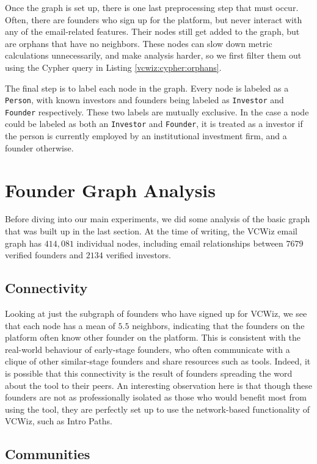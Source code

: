 Once the graph is set up, there is one last preprocessing step that must occur. Often, there are founders who sign up for the platform, but never interact with any of the email-related features. Their nodes still get added to the graph, but are orphans that have no neighbors. These nodes can slow down metric calculations unnecessarily, and make analysis harder, so we first filter them out using the Cypher query in Listing \ref{vcwiz:cypher:orphans}.

The final step is to label each node in the graph. Every node is labeled as a \texttt{Person}, with known investors and founders being labeled as \texttt{Investor} and \texttt{Founder} respectively. These two labels are mutually exclusive. In the case a node could be labeled as both an \texttt{Investor} and \texttt{Founder}, it is treated as a investor if the person is currently employed by an institutional investment firm, and a founder otherwise.

\section{Founder Graph Analysis}

Before diving into our main experiments, we did some analysis of the basic graph that was built up in the last section. At the time of writing, the VCWiz email graph has $414,081$ individual nodes, including email relationships between $7679$ verified founders and $2134$ verified investors.

\subsection{Connectivity}

Looking at just the subgraph of founders who have signed up for VCWiz, we see that each node has a mean of $5.5$ neighbors, indicating that the founders on the platform often know other founder on the platform. This is consistent with the real-world behaviour of early-stage founders, who often communicate with a clique of other similar-stage founders and share resources such as tools. Indeed, it is possible that this connectivity is the result of founders spreading the word about the tool to their peers. An interesting observation here is that though these founders are not as professionally isolated as those who would benefit most from using the tool, they are perfectly set up to use the network-based functionality of VCWiz, such as Intro Paths.

\subsection{Communities}

